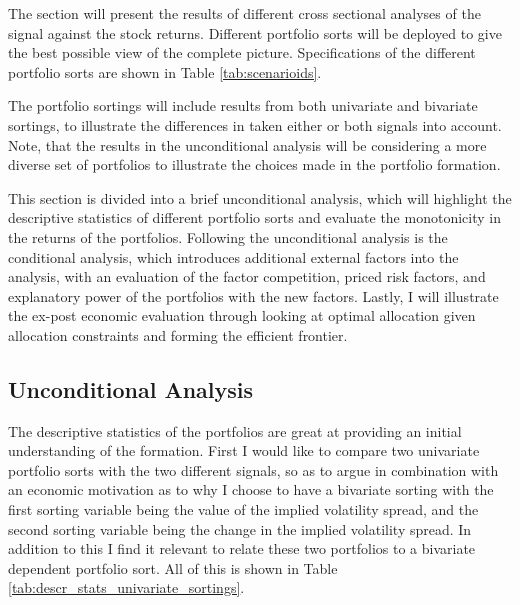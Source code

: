 

The section will present the results of different cross sectional analyses of the signal against the stock returns. Different portfolio sorts will be deployed to give the best possible view of the complete picture. Specifications of the different portfolio sorts are shown in Table \ref{tab:scenarioids}. 

The portfolio sortings will include results from both univariate and bivariate sortings, to illustrate the differences in taken either or both signals into account. Note, that the results in the unconditional analysis will be considering a more diverse set of portfolios to illustrate the choices made in the portfolio formation. 

This section is divided into a brief unconditional analysis, which will highlight the descriptive statistics of different portfolio sorts and evaluate the monotonicity in the returns of the portfolios. Following the unconditional analysis is the conditional analysis, which introduces additional external factors into the analysis, with an evaluation of the factor competition, priced risk factors, and explanatory power of the portfolios with the new factors. Lastly, I will illustrate the ex-post economic evaluation through looking at optimal allocation given allocation constraints and forming the efficient frontier.



\subsection{Unconditional Analysis}

The descriptive statistics of the portfolios are great at providing an initial understanding of the formation. First I would like to compare two univariate portfolio sorts with the two different signals, so as to argue in combination with an economic motivation as to why I choose to have a bivariate sorting with the first sorting variable being the value of the implied volatility spread, and the second sorting variable being the change in the implied volatility spread. In addition to this I find it relevant to relate these two portfolios to a bivariate dependent portfolio sort. All of this is shown in Table \ref{tab:descr_stats_univariate_sortings}. 

